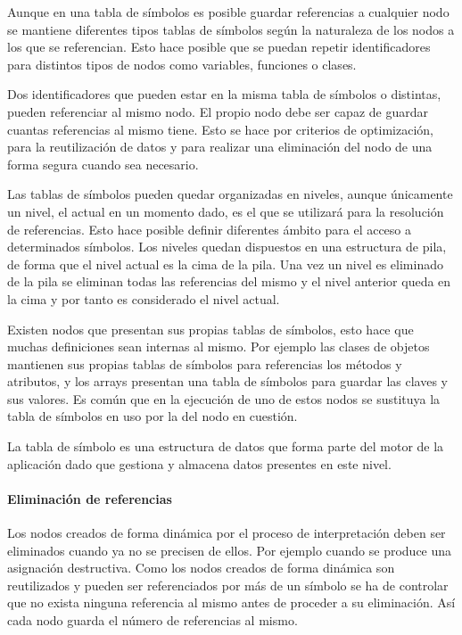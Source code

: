 Aunque en una tabla de símbolos es posible guardar referencias a cualquier nodo se mantiene diferentes tipos tablas de símbolos según la naturaleza de los nodos a los que se
referencian. Esto hace posible que se puedan repetir identificadores para distintos tipos de nodos como variables, funciones o clases.

Dos identificadores que pueden estar en la misma tabla de símbolos o distintas, pueden referenciar al mismo nodo. El propio nodo debe ser capaz de guardar cuantas referencias al 
mismo tiene. Esto se hace por criterios de optimización, para la reutilización de datos y para realizar una eliminación del nodo de una forma segura cuando sea necesario.

Las tablas de símbolos pueden quedar organizadas en niveles, aunque únicamente un nivel, el actual en un momento dado, es el que se utilizará para la resolución de referencias.
Esto hace posible definir diferentes ámbito para el acceso a determinados símbolos. Los niveles quedan dispuestos en una estructura de pila, de forma que el nivel actual es
la cima de la pila. Una vez un nivel es eliminado de la pila se eliminan todas las referencias del mismo y el nivel anterior queda en la cima y por tanto es considerado el nivel actual.

Existen nodos que presentan sus propias tablas de símbolos, esto hace que muchas definiciones sean internas al mismo. Por ejemplo las clases de objetos mantienen sus propias tablas
de símbolos para referencias los métodos y atributos, y los arrays presentan una tabla de símbolos para guardar las claves y sus valores. Es común que en la ejecución 
de uno de estos nodos se sustituya la tabla de símbolos en uso por la del nodo en cuestión.

La tabla de símbolo es una estructura de datos que forma parte del motor de la aplicación dado que gestiona y almacena datos presentes en este nivel. 

\paragraph{Eliminación de referencias}
Los nodos creados de forma dinámica por el proceso de interpretación deben ser eliminados cuando ya no se precisen de ellos. Por ejemplo cuando se produce una asignación destructiva. Como
los nodos creados de forma dinámica son reutilizados y pueden ser referenciados por más de un símbolo se ha de controlar que no exista ninguna referencia al mismo 
antes de proceder a su eliminación. Así cada nodo guarda el número de referencias al mismo.

